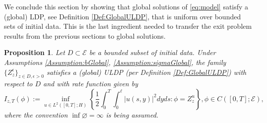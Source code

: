 \documentclass[10pt, reqno]{amsart}
\newcommand{\e}{\mathcal{E}}
\newtheorem{prop}{Proposition}
\theoremstyle{definition}
\numberwithin{lem}{section}
\numberwithin{cor}{section}
\numberwithin{prop}{section}
\numberwithin{thm}{section}
\numberwithin{dfn}{section}
\begin{document}
We conclude this section by showing that global solutions of \eqref{eq:model} satisfy a (global) LDP, see Definition \ref{Def:GlobalULDP}, that is uniform over bounded sets of initial data. This is the last ingredient needed to transfer the exit problem results from the previous sections to global solutions.


 

             \begin{prop}\label{prop:ULDPGlobal} Let $D \subset \e$ be a bounded subset of initial data. Under Assumptions \ref{Assumption:bGlobal}, \ref{Assumption:sigmaGlobal}, the family $\{Z^\epsilon_z\}_{z \in D, \epsilon>0}  $ satisfies a (global) ULDP (per Definition \ref{Def:GlobalULDP}) with respect to $D$ and with rate function given by
             \begin{equation*}\label{eq:RateFunctionWaveGlobal}
             I_{z,T}(\phi) := \inf_{u\in L^2([0,T];H)} \left\{ \frac{1}{2}\int_0^T \int_0^\ell |u(s,y)|^2 dyds: \phi=Z^{u}_z \right\}, \phi\in C([0,T];\e),
         \end{equation*}
            where the convention $\inf\varnothing=\infty$ is being assumed.
             \end{prop}

              
             
\end{document}
